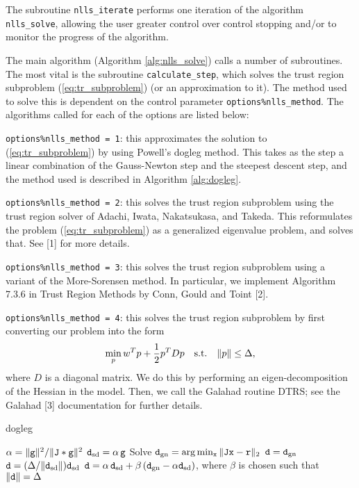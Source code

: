 The subroutine \texttt{nlls\_iterate} performs one iteration of the algorithm
\texttt{nlls\_solve}, allowing the user greater control over control stopping and/or to monitor the progress of the algorithm.

The main algorithm (Algorithm \ref{alg:nlls_solve}) calls a number of subroutines.  
The most vital is the subroutine {\tt calculate\_step}, which solves the trust region 
subproblem (\ref{eq:tr_subproblem}) (or an approximation to it). The method used to solve
this is dependent on the control parameter {\tt options\%nlls\_method}. The algorithms called for each of the options are listed below:
\begin{description}
\item {\tt options\%nlls\_method = 1}: this approximates the solution to (\ref{eq:tr_subproblem}) by using Powell's dogleg method.  This takes as the step a linear combination of the Gauss-Newton step and the steepest descent step, and the method used is described in Algorithm \ref{alg:dogleg}.
\item {\tt options\%nlls\_method = 2}: this solves the trust region subproblem using the trust region solver of  Adachi, Iwata, Nakatsukasa, and Takeda.  This reformulates the 
problem (\ref{eq:tr_subproblem}) as a generalized eigenvalue problem, and solves that.  See
[1] for more details.
\item {\tt options\%nlls\_method = 3}: this solves the trust region subproblem using 
a variant of the More-Sorensen method.  In particular, we implement Algorithm 7.3.6
 in Trust Region Methods by Conn, Gould and Toint [2].
\item {\tt options\%nlls\_method = 4}: this solves the trust region subproblem by first 
converting our problem into the form
$$\min_p w^T p + \frac{1}{2} p^T D p \quad {\rm s.t.} \quad \|p\| \leq \Delta,$$
where $D$ is a diagonal matrix.  We do this by performing an eigen-decomposition of 
the Hessian in the model.  Then, we call the {\sc Galahad} routine {\sc DTRS}; see 
the {\sc Galahad} [3] documentation for further details.
\end{description}

\begin{algorithm}
\caption{dogleg}
\label{alg:dogleg}
  \begin{algorithmic}[1]
     
        \State $\alpha = \|{\tt g}\|^2 / \|{\tt J} * {\tt g}\|^2$
        \State ${\tt d}_{\rm sd} = \alpha \,{\tt g}$
        \State Solve ${\tt d}_{\rm gn} = \arg \min_{{\tt x}}\|{\tt J} {\tt x}- {\tt r}\|_2$
        \State ${\tt d} = {\tt d}_{\rm gn}$
        \State ${\tt d} = (\Delta / \|{\tt d}_{\rm sd}\|) {\tt d}_{\rm sd}$
        \Else
        \State ${\tt d} = \alpha \, {\tt d}_{\rm sd} + \beta\, ({\tt d}_{\rm gn} - \alpha {\tt d}_{\rm sd})$, where $\beta$ is chosen such that $\|{\tt d}\| = \Delta$
        \EndIf
  \end{algorithmic}
\end{algorithm}

